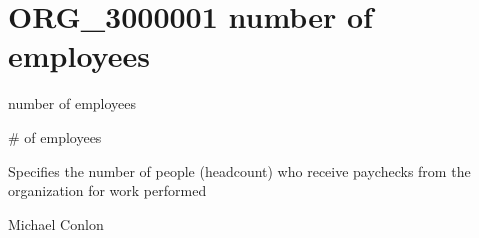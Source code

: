 \documentclass[letterpaper,10pt,english]{sphinxmanual}
\begin{document}
\section{ORG\_3000001 \sphinxhyphen{} number of employees}
\label{\detokenize{doc-ORG_3000001:org-3000001-number-of-employees}}\label{\detokenize{doc-ORG_3000001:index-0}}\label{\detokenize{doc-ORG_3000001::doc}}
\begin{sphinxShadowBox}

\sphinxAtStartPar
number of employees
\end{sphinxShadowBox}

\begin{sphinxShadowBox}

\sphinxAtStartPar
\# of employees
\end{sphinxShadowBox}

\begin{sphinxShadowBox}

\sphinxAtStartPar
{}
\end{sphinxShadowBox}

\begin{sphinxShadowBox}

\sphinxAtStartPar
Specifies the number of people (headcount) who receive paychecks from the organization for work performed
\end{sphinxShadowBox}

\begin{sphinxShadowBox}

\sphinxAtStartPar
Michael Conlon 
\end{sphinxShadowBox}

\begin{sphinxShadowBox}

\sphinxAtStartPar
{\hyperref[\detokenize{doc-ORG_0000001::doc}]{}}
\end{sphinxShadowBox}

\begin{sphinxShadowBox}

\sphinxAtStartPar
{}
\end{sphinxShadowBox}
\end{document}

